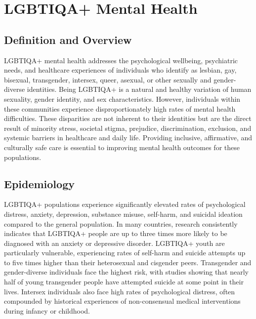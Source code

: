 \chapter{LGBTIQA+ Mental Health}

\section*{Definition and Overview}
LGBTIQA+ mental health addresses the psychological wellbeing, psychiatric needs, and healthcare experiences of individuals who identify as lesbian, gay, bisexual, transgender, intersex, queer, asexual, or other sexually and gender-diverse identities. Being LGBTIQA+ is a natural and healthy variation of human sexuality, gender identity, and sex characteristics. However, individuals within these communities experience disproportionately high rates of mental health difficulties. These disparities are not inherent to their identities but are the direct result of minority stress, societal stigma, prejudice, discrimination, exclusion, and systemic barriers in healthcare and daily life. Providing inclusive, affirmative, and culturally safe care is essential to improving mental health outcomes for these populations.

\section*{Epidemiology}
LGBTIQA+ populations experience significantly elevated rates of psychological distress, anxiety, depression, substance misuse, self-harm, and suicidal ideation compared to the general population. In many countries, research consistently indicates that LGBTIQA+ people are up to three times more likely to be diagnosed with an anxiety or depressive disorder. LGBTIQA+ youth are particularly vulnerable, experiencing rates of self-harm and suicide attempts up to five times higher than their heterosexual and cisgender peers. Transgender and gender-diverse individuals face the highest risk, with studies showing that nearly half of young transgender people have attempted suicide at some point in their lives. Intersex individuals also face high rates of psychological distress, often compounded by historical experiences of non-consensual medical interventions during infancy or childhood.

